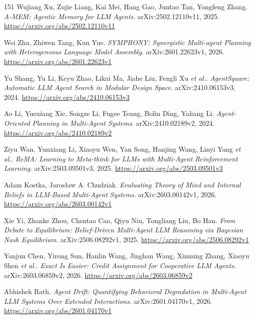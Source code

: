 \documentclass[11pt,a4paper]{article}
\begin{document}
\begin{thebibliography}{151}
Wujiang Xu, Zujie Liang, Kai Mei, Hang Gao, Juntao Tan, Yongfeng Zhang.
\newblock \emph{A-MEM: Agentic Memory for LLM Agents}.
\newblock arXiv:2502.12110v11, 2025.
\newblock \url{https://arxiv.org/abs/2502.12110v11}

Wei Zhu, Zhiwen Tang, Kun Yue.
\newblock \emph{SYMPHONY: Synergistic Multi-agent Planning with Heterogeneous Language Model Assembly}.
\newblock arXiv:2601.22623v1, 2026.
\newblock \url{https://arxiv.org/abs/2601.22623v1}

Yu Shang, Yu Li, Keyu Zhao, Likai Ma, Jiahe Liu, Fengli Xu \emph{et al.}.
\newblock \emph{AgentSquare: Automatic LLM Agent Search in Modular Design Space}.
\newblock arXiv:2410.06153v3, 2024.
\newblock \url{https://arxiv.org/abs/2410.06153v3}

Ao Li, Yuexiang Xie, Songze Li, Fugee Tsung, Bolin Ding, Yaliang Li.
\newblock \emph{Agent-Oriented Planning in Multi-Agent Systems}.
\newblock arXiv:2410.02189v2, 2024.
\newblock \url{https://arxiv.org/abs/2410.02189v2}

Ziyu Wan, Yunxiang Li, Xiaoyu Wen, Yan Song, Hanjing Wang, Linyi Yang \emph{et al.}.
\newblock \emph{ReMA: Learning to Meta-think for LLMs with Multi-Agent Reinforcement Learning}.
\newblock arXiv:2503.09501v3, 2025.
\newblock \url{https://arxiv.org/abs/2503.09501v3}

Adam Kostka, Jaros\l{}aw A. Chudziak.
\newblock \emph{Evaluating Theory of Mind and Internal Beliefs in LLM-Based Multi-Agent Systems}.
\newblock arXiv:2603.00142v1, 2026.
\newblock \url{https://arxiv.org/abs/2603.00142v1}

Xie Yi, Zhanke Zhou, Chentao Cao, Qiyu Niu, Tongliang Liu, Bo Han.
\newblock \emph{From Debate to Equilibrium: Belief-Driven Multi-Agent LLM Reasoning via Bayesian Nash Equilibrium}.
\newblock arXiv:2506.08292v1, 2025.
\newblock \url{https://arxiv.org/abs/2506.08292v1}

Yanjun Chen, Yirong Sun, Hanlin Wang, Jinghan Wang, Xinming Zhang, Xiaoyu Shen \emph{et al.}.
\newblock \emph{Exact Is Easier: Credit Assignment for Cooperative LLM Agents}.
\newblock arXiv:2603.06859v2, 2026.
\newblock \url{https://arxiv.org/abs/2603.06859v2}

Abhishek Rath.
\newblock \emph{Agent Drift: Quantifying Behavioral Degradation in Multi-Agent LLM Systems Over Extended Interactions}.
\newblock arXiv:2601.04170v1, 2026.
\newblock \url{https://arxiv.org/abs/2601.04170v1}


\end{thebibliography}
\end{document}
